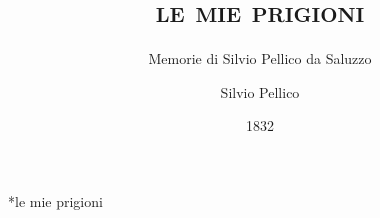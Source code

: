 \documentclass[
	a5paper,
	oneside,
	9pt,
	draft
]{scrbook}
\author{Silvio Pellico}
\title{\textsc{le mie prigioni}}
\subtitle{\color{black!60}Memorie di Silvio Pellico da Saluzzo}
\date{1832}
\makeatletter
\renewcommand\part{%
	\if@openright
	\cleardoublepage
	\else
	\clearpage
	\fi
	\thispagestyle{empty}%
	\if@twocolumn
	\onecolumn
	\@tempswatrue
	\else
	\@tempswafalse
	\fi
	\null\vfil
\secdef\@part\@spart}
\makeatother
\begin{document}
\frontmatter
	\maketitle

	\clearpage
	

	\part*{\sc le mie prigioni}

\mainmatter
	
	
	

\backmatter
\tableofcontents
\end{document}
